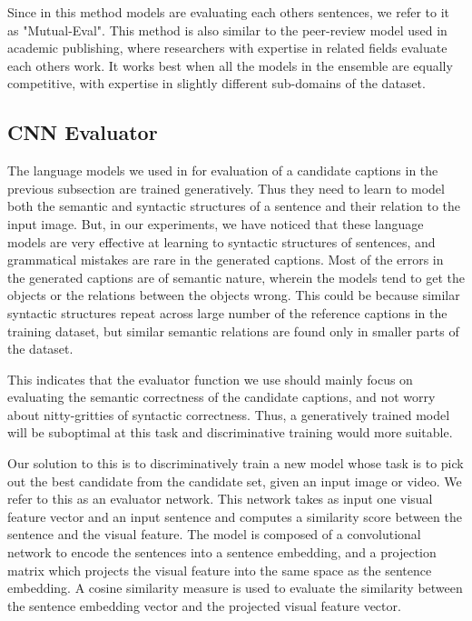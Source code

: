 Since in this method models are evaluating each others sentences, we refer to it
as "Mutual-Eval". 
This method is also similar to the peer-review model used in academic
publishing, where researchers with expertise in related fields evaluate each
others work.
It works best when all the models in the ensemble are equally competitive, with
expertise in slightly different sub-domains of the dataset.

\subsection{CNN Evaluator}
The language models we used in for evaluation of a candidate captions in the
previous subsection are trained generatively.
Thus they need to learn to model both the semantic and syntactic structures of a
sentence and their relation to the input image.
But, in our experiments, we have noticed that these language models are very
effective at learning to syntactic structures of sentences, and grammatical
mistakes are rare in the generated captions.
Most of the errors in the generated captions are of semantic nature, wherein the
models tend to get the objects or the relations between the objects wrong.
This could be because similar syntactic structures repeat across large number of
the reference captions in the training dataset, but similar semantic relations
are found only in smaller parts of the dataset.

This indicates that the evaluator function we use should mainly focus on
evaluating the semantic correctness of the candidate captions, and not worry
about nitty-gritties of syntactic correctness. 
Thus, a generatively trained model will be suboptimal at this task and
discriminative training would more suitable. 

Our solution to this is to discriminatively train a new model whose task is to
pick out the best candidate from the candidate set, given an input image or
video.
We refer to this as an evaluator network.
This network takes as input one visual feature vector and an input sentence and
computes a similarity score between the sentence and the visual feature. 
The model is composed of a convolutional network to encode the sentences into a
sentence embedding, and a projection matrix which projects the visual feature
into the same space as the sentence embedding.
A cosine similarity measure is used to evaluate the similarity between the
sentence embedding vector and the projected visual feature vector. 

